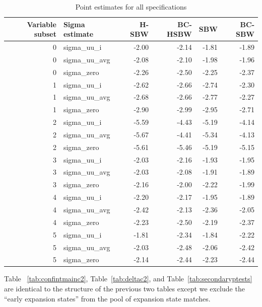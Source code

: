 \documentclass[12pt]{article}
\begin{document}
\begin{table}[ht]
\centering
\begin{tabular}{rlrrrr}
  \toprule
Variable subset & Sigma estimate & H-SBW & BC-HSBW & SBW & BC-SBW \\ 
  \midrule
0 & sigma\_uu\_i & -2.00 & -2.14 & -1.81 & -1.89 \\ 
  0 & sigma\_uu\_avg & -2.08 & -2.10 & -1.98 & -1.96 \\ 
  0 & sigma\_zero & -2.26 & -2.50 & -2.25 & -2.37 \\ 
  1 & sigma\_uu\_i & -2.62 & -2.66 & -2.74 & -2.30 \\ 
  1 & sigma\_uu\_avg & -2.68 & -2.66 & -2.77 & -2.27 \\ 
  1 & sigma\_zero & -2.90 & -2.99 & -2.95 & -2.71 \\ 
  2 & sigma\_uu\_i & -5.59 & -4.43 & -5.19 & -4.14 \\ 
  2 & sigma\_uu\_avg & -5.67 & -4.41 & -5.34 & -4.13 \\ 
  2 & sigma\_zero & -5.61 & -5.46 & -5.19 & -5.15 \\ 
  3 & sigma\_uu\_i & -2.03 & -2.16 & -1.93 & -1.95 \\ 
  3 & sigma\_uu\_avg & -2.03 & -2.08 & -1.91 & -1.89 \\ 
  3 & sigma\_zero & -2.16 & -2.00 & -2.22 & -1.99 \\ 
  4 & sigma\_uu\_i & -2.20 & -2.17 & -1.95 & -1.89 \\ 
  4 & sigma\_uu\_avg & -2.42 & -2.13 & -2.36 & -2.05 \\ 
  4 & sigma\_zero & -2.23 & -2.50 & -2.19 & -2.37 \\ 
  5 & sigma\_uu\_i & -1.81 & -2.34 & -1.84 & -2.22 \\ 
  5 & sigma\_uu\_avg & -2.03 & -2.48 & -2.06 & -2.42 \\ 
  5 & sigma\_zero & -2.14 & -2.44 & -2.23 & -2.44 \\ 
   \bottomrule
\end{tabular}
\caption{Point estimates for all specifications}
\label{tab:ptests}
\end{table}

Table ~\ref{tab:confintmainc2}, Table~\ref{tab:deltac2}, and Table~\ref{tab:secondaryptests} are identical to the structure of the previous two tables except we exclude the ``early expansion states'' from the pool of expansion state matches. 
\end{document}
